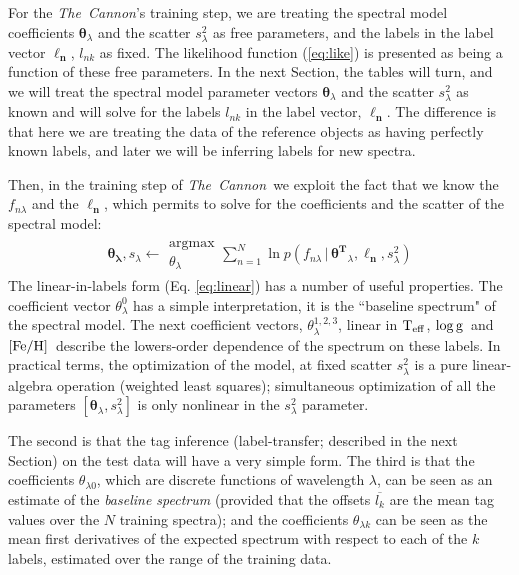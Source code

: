 \documentclass[12pt, preprint]{aastex}
\newcommand{\set}[1]{\bm{#1}}
\newcommand{\mean}[1]{\overline{#1}}
\newcommand{\given}{\,|\,}
\newcommand{\teff}{\mbox{$\rm T_{eff}$}}
\newcommand{\feh}{\mbox{$\rm [Fe/H]$}}
\newcommand{\logg}{\mbox{$\rm \log g$}}
\newcommand{\tc}{\textsl{The~Cannon}}
\begin{document}
For the \tc 's training step, we are treating the spectral model coefficients
$\set{\theta}_\lambda$ and the scatter $s_\lambda^2$ as free parameters, and the
labels in the label vector $\set{\ell_n}$, $l_{nk}$ as fixed.
The likelihood function (\ref{eq:like}) is presented as being a
function of these free parameters.
In the next Section, the tables will turn, and we will treat the
spectral model parameter vectors $\set{\theta}_\lambda$ and the scatter $s_{\lambda}^2$ as known and will solve for the
labels $l_{nk}$ in the label vector, $\set{\ell_n}$.
The difference is that here we are treating the data of the reference objects as
having perfectly known labels, and later we will be inferring labels for
new spectra.

Then, in the training step of \tc\ we exploit the fact that we know the $f_{n\lambda}$
and the $\set{\ell_n}$, which permits to solve for the coefficients and the scatter of the spectral model:
\begin{eqnarray}
\set{\theta_\lambda},s_\lambda \leftarrow \substack{\mbox{argmax}\\
{\theta_\lambda}  }
\sum_{n=1}^N \ln p(f_{n\lambda}\given\set{\theta^T}_\lambda, \boldsymbol{\ell_n}, s_\lambda^2)
\label{eq:trainingstep}
\end{eqnarray}
The linear-in-labels form (Eq. \ref{eq:linear}) has a number of useful properties.
The coefficient vector $\theta^0_\lambda$ has a simple interpretation, it is the ``baseline spectrum" of the spectral model. 
The next coefficient vectors,  $\theta^{1,2,3}_\lambda$, linear in \teff , \logg ~and \feh\ 
describe the lowers-order dependence of the spectrum on these labels.
In practical terms, the optimization of the model, at fixed scatter
$s_\lambda^2$ is a pure linear-algebra operation (weighted least
squares); simultaneous optimization of all the parameters
$[\set{\theta}_\lambda,s_\lambda^2]$ is only nonlinear in the $s_\lambda^2$
parameter.

%
The second is that the tag inference (label-transfer; described in the
next Section) on the test data will have a very simple form.
The third is that the coefficients $\theta_{\lambda 0}$, which are discrete
functions of wavelength $\lambda$, can be seen as an estimate of
the \emph{baseline spectrum} (provided that the offsets $\mean{l_k}$ are
the mean tag values over the $N$ training spectra); and the
coefficients $\theta_{\lambda k}$ can be seen as the mean first derivatives of
the expected spectrum with respect to each of the $k$ labels, estimated
over the range of the training data.
\end{document}
